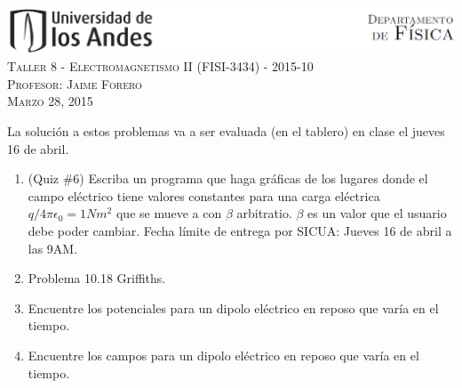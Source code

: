 \documentclass[letterpaper,10pt,onecolumn]{article}
\begin{document}
\begin{center}

\includegraphics[width=490pt]{header.png}\\[0.5cm]

\textsc{\LARGE Taller 8 - Electromagnetismo II (FISI-3434) - 2015-10}\\[0.5cm]

\textsc{\Large{Profesor: Jaime Forero}} \\[0.5cm]

\textsc{Marzo 28, 2015} \\[0.5cm]

\end{center}

La soluci\'on a estos problemas va a ser evaluada (en el tablero) en
clase el jueves 16 de abril.

\begin{enumerate}
\item (Quiz \#6) Escriba un programa que haga gr\'aficas de los lugares donde el campo el\'ectrico tiene valores constantes para una carga el\'ectrica $q/4\pi\epsilon_0=1N m^2$ que se mueve a con $\beta$ arbitratio. $\beta$ es un valor que el usuario debe poder cambiar. Fecha l\'imite de entrega por SICUA: Jueves 16 de abril a las 9AM.

\item Problema 10.18 Griffiths. 
\item Encuentre los potenciales para un dipolo el\'ectrico en reposo
  que var\'ia en el tiempo. 
\item Encuentre los campos para un dipolo el\'ectrico en reposo que
  var\'ia en el tiempo.  
\end{enumerate}
\end{document}
